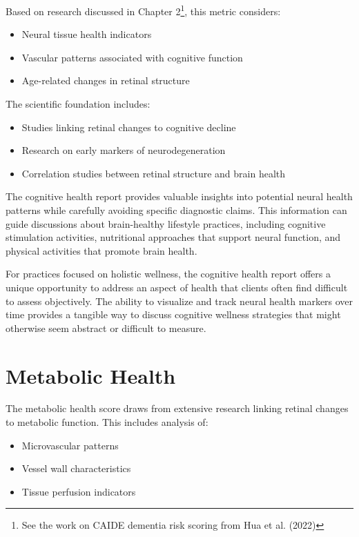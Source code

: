 \documentclass[
  Letterpaper,
]{scrbook}
\providecommand{\tightlist}{%
  \setlength{\itemsep}{0pt}\setlength{\parskip}{0pt}}\usepackage{longtable,booktabs,array}
\begin{document}
Based on research discussed in Chapter 2\footnote{See the work on CAIDE
  dementia risk scoring from Hua et al. (2022)}, this metric considers:

\begin{itemize}
\tightlist
\item
  Neural tissue health indicators
\item
  Vascular patterns associated with cognitive function
\item
  Age-related changes in retinal structure
\end{itemize}

The scientific foundation includes:

\begin{itemize}
\tightlist
\item
  Studies linking retinal changes to cognitive decline
\item
  Research on early markers of neurodegeneration
\item
  Correlation studies between retinal structure and brain health
\end{itemize}

The cognitive health report provides valuable insights into potential
neural health patterns while carefully avoiding specific diagnostic
claims. This information can guide discussions about brain-healthy
lifestyle practices, including cognitive stimulation activities,
nutritional approaches that support neural function, and physical
activities that promote brain health.

For practices focused on holistic wellness, the cognitive health report
offers a unique opportunity to address an aspect of health that clients
often find difficult to assess objectively. The ability to visualize and
track neural health markers over time provides a tangible way to discuss
cognitive wellness strategies that might otherwise seem abstract or
difficult to measure.

\section{Metabolic Health}\label{metabolic-health}

The metabolic health score draws from extensive research linking retinal
changes to metabolic function. This includes analysis of:

\begin{itemize}
\tightlist
\item
  Microvascular patterns
\item
  Vessel wall characteristics
\item
  Tissue perfusion indicators
\end{itemize}
\end{document}
